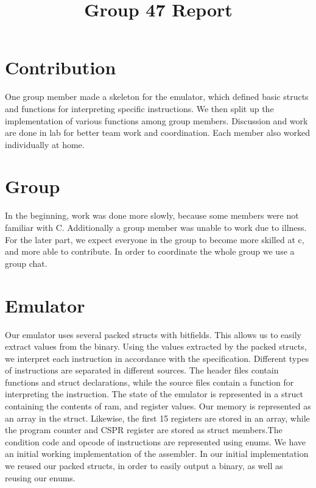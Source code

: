 \documentclass{article}
\title{Group 47 Report}
\date{\vspace{-5ex}}
\begin{document}
\maketitle

\section{Contribution}

One group member made a skeleton for the emulator, which defined basic structs and functions for interpreting specific instructions. We then split up the implementation of various functions among group members. Discussion and work are done in lab for better team work and coordination. Each member also worked individually at home.

\section{Group}

In the beginning, work was done more slowly, because some members were not familiar with C. Additionally a group member was unable to work due to illness. For the later part, we expect everyone in the group to become more skilled at c, and more able to contribute. In order to coordinate the whole group we use a group chat.

\section{Emulator}

Our emulator uses several packed structs with bitfields. This allows us to easily extract values from the binary. Using the values extracted by the packed structs, we interpret each instruction in accordance with the specification. Different types of instructions are separated in different sources. The header files contain functions and struct declarations, while the source files contain a function for interpreting the instruction. The state of the emulator is represented in a struct containing the contents of ram, and register values. Our memory is represented as an array in the struct. Likewise, the first 15 registers are stored in an array, while the program counter and CSPR register are stored as struct members.The condition code and opcode of instructions are represented using enums.  We have an initial working implementation of the assembler. In our initial implementation we reused our packed structs, in order to easily output a binary, as well as reusing our enums.
\end{document}
